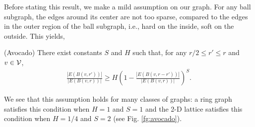 Before stating this result, we make a mild assumption on our graph. 
For any ball subgraph, the edges around its center are not too sparse, compared to the edges 
in the outer region of the ball subgraph, i.e., hard on the inside, soft on the outside. This yields, 
\begin{assumption}(Avocado) There exist constants $S$ and $H$ such that, for any $r/2 \leq r' \leq r$ and $v \in \mathcal{V}$,
{\begin{align}\label{eq:lightskirt}
\frac{|E(B(v,r'))|}{|E(B(v,r))|} \geq H\left(1 - \frac{|E(B(v,r-r'))|}{|E(B(v,r))|}\right)^S.
\end{align}}
\end{assumption}
We see that this assumption holds for many classes of graphs:
a ring graph satisfies this condition when $H=1$ and $S=1$ and the 2-D lattice satisfies this condition when $H=1/4$ and $S=2$ (see Fig. \ref{fg:avocado}). 
